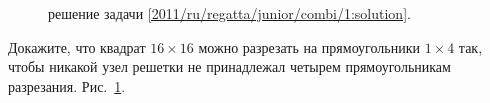 \ifsolution
\begin{figure}\centering
    \caption{решение задачи \ref{2011/ru/regatta/junior/combi/1:solution}.}
    \label{2011/ru/regatta/junior/combi/1:solution:fig}
\end{figure}%
\fi %

\problem
Докажите, что квадрат $16 \times 16$ можно разрезать на прямоугольники
$1 \times 4$ так, чтобы никакой узел решетки не принадлежал четырем
прямоугольникам разрезания.
\solution
\label{2011/ru/regatta/junior/combi/1:solution}%
Рис.~\ref{2011/ru/regatta/junior/combi/1:solution:fig}.
\endproblem
